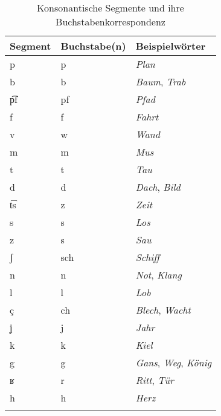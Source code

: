 \begin{table}[!htbp]
  \centering
    \begin{tabular}{lll}
      \lsptoprule
      \textbf{Segment} & \textbf{Buchstabe(n)} & \textbf{Beispielwörter} \\
      \midrule
     p & p & \textit{Plan} \\
     b & b & \textit{Baum}, \textit{Trab} \\
     p͡f & pf & \textit{Pfad} \\
     f & f & \textit{Fahrt} \\
     v & w & \textit{Wand} \\
     m & m & \textit{Mus} \\
     t & t & \textit{Tau} \\
     d & d & \textit{Dach}, \textit{Bild}\\
     t͡s & z & \textit{Zeit} \\
     s & s & \textit{Los} \\
     z & s & \textit{Sau} \\
     ʃ & sch & \textit{Schiff} \\
     n & n & \textit{Not}, \textit{Klang} \\
     l & l & \textit{Lob} \\
     ç & ch & \textit{Blech}, \textit{Wacht} \\
     ʝ & j & \textit{Jahr} \\
     k & k & \textit{Kiel} \\
     g & g & \textit{Gans}, \textit{Weg}, \textit{König} \\
     ʁ & r & \textit{Ritt}, \textit{Tür} \\
     h & h & \textit{Herz} \\
      \lspbottomrule
    \end{tabular}
  \caption{Konsonantische Segmente und ihre Buchstabenkorrespondenz}
  \label{tab:konsonantenschreibungen007}
\end{table}

